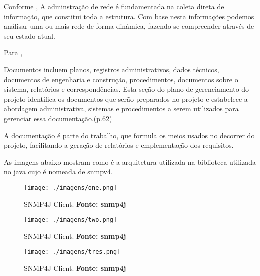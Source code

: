 \par Conforme , A adminstração de rede é fundamentada na coleta direta de
informação, que constitui toda a estrutura. Com base nesta informações podemos análisar uma
ou mais rede de forma dinâmica, fazendo-se compreender através de seu estado atual.

\par Para ,
\begin{citacao}
	Documentos incluem planos, registros administrativos, dados técnicos, documentos
	de engenharia e construção, procedimentos, documentos sobre o sistema,
	relatórios e correspondências. Esta seção do plano de gerenciamento do
	projeto identifica os documentos que serão preparados no projeto e estabelece
	a abordagem administrativa, sistemas e procedimentos a serem utilizados para
	gerenciar essa documentação.(p.62)
\end{citacao}

\par A documentação é parte do trabalho, que formula os meios usados no decorrer do projeto,
facilitando a geração de relatórios e emplementação dos requisitos.

\par As imagens abaixo mostram como é a arquitetura utilizada na biblioteca
utilizada no java cujo é nomeada de snmpv4.



\begin{figure}[h!]
  \centerline{\texttt{[image: ./imagens/one.png]}}
  \caption[Exemplo de criação de um projeto Web no Eclipse]
          {SNMP4J Client. \textbf{Fonte: snmp4j}
          \cite{Diagrama_do_SMNP4J}}
\label{fig:exemplo1}
\end{figure}





\begin{figure}[h!]
  \centerline{\texttt{[image: ./imagens/two.png]}}
  \caption[Exemplo de criação de um projeto Web no Eclipse]
          {SNMP4J Client. \textbf{Fonte: snmp4j}
          \cite{Diagrama_do_SMNP4J}}
\label{fig:exemplo1}
\end{figure}




\begin{figure}[h!]
  \centerline{\texttt{[image: ./imagens/tres.png]}}
  \caption[Exemplo de criação de um projeto Web no Eclipse]
          {SNMP4J Client. \textbf{Fonte: snmp4j}
          \cite{Diagrama_do_SMNP4J}}
\label{fig:exemplo1}
\end{figure}





